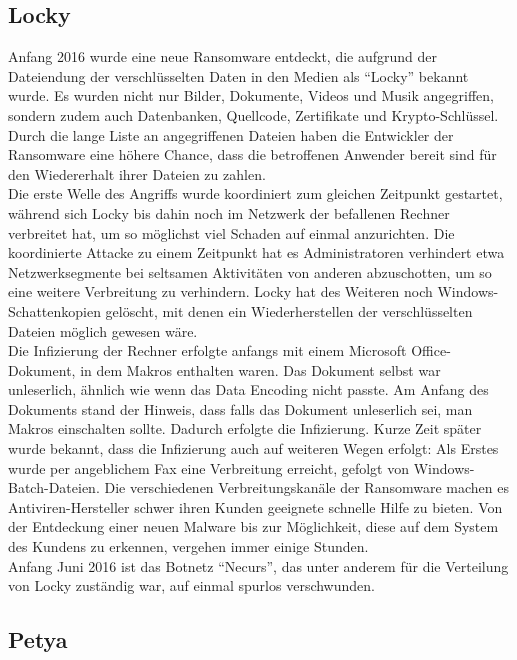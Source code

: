 \subsection{Locky}
Anfang 2016\cite{locky:start} wurde eine neue Ransomware entdeckt, die aufgrund der Dateiendung der verschlüsselten Daten in den Medien als ``Locky'' bekannt wurde. Es wurden nicht nur Bilder, Dokumente, Videos und Musik angegriffen, sondern zudem auch Datenbanken, Quellcode, Zertifikate und Krypto-Schlüssel. Durch die lange Liste an angegriffenen Dateien haben die Entwickler der Ransomware eine höhere Chance, dass die betroffenen Anwender bereit sind für den Wiedererhalt ihrer Dateien zu zahlen.\\
Die erste Welle des Angriffs wurde koordiniert zum gleichen Zeitpunkt gestartet, während sich Locky bis dahin noch im Netzwerk der befallenen Rechner verbreitet hat, um so möglichst viel Schaden auf einmal anzurichten. Die koordinierte Attacke zu einem Zeitpunkt hat es Administratoren verhindert etwa Netzwerksegmente bei seltsamen Aktivitäten von anderen abzuschotten, um so eine weitere Verbreitung zu verhindern. Locky hat des Weiteren noch Windows-Schattenkopien gelöscht, mit denen ein Wiederherstellen der verschlüsselten Dateien möglich gewesen wäre.\\

Die Infizierung der Rechner erfolgte anfangs mit einem Microsoft Office-Dokument, in dem Makros enthalten waren\cite{locky:infection}. Das Dokument selbst war unleserlich, ähnlich wie wenn das Data Encoding nicht passte. Am Anfang des Dokuments stand der Hinweis, dass falls das Dokument unleserlich sei, man Makros einschalten sollte. Dadurch erfolgte die Infizierung. Kurze Zeit später wurde bekannt, dass die Infizierung auch auf weiteren Wegen erfolgt: Als Erstes wurde per angeblichem Fax eine Verbreitung erreicht\cite{locky:fax}, gefolgt von Windows-Batch-Dateien\cite{locky:batch}. Die verschiedenen Verbreitungskanäle der Ransomware machen es Antiviren-Hersteller schwer ihren Kunden geeignete schnelle Hilfe zu bieten. Von der Entdeckung einer neuen Malware bis zur Möglichkeit, diese auf dem System des Kundens zu erkennen, vergehen immer einige Stunden.\\

Anfang Juni 2016\cite{locky:end} ist das Botnetz ``Necurs'', das unter anderem für die Verteilung von Locky zuständig war, auf einmal spurlos verschwunden.

		
\subsection{Petya}
